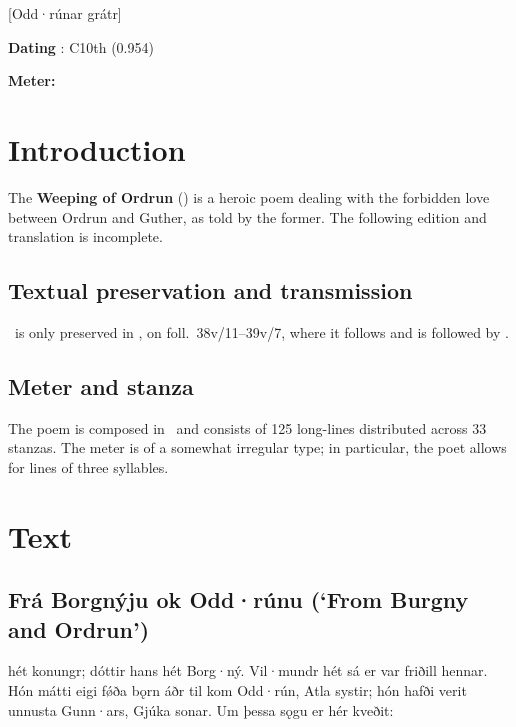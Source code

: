 [Odd·rúnar grátr]

\begin{flushright}%
\textbf{Dating} \parencite{Sapp2022}: C10th (0.954)

\textbf{Meter:} \Fornyrdislag%
\end{flushright}%

\section{Introduction}

The \textbf{Weeping of Ordrun} (\Oddrunargratr) is a heroic poem dealing with the forbidden love between Ordrun and Guther, as told by the former.  The following edition and translation is incomplete.

\subsection{Textual preservation and transmission}

\Oddrunargratr\ is only preserved in \Regius, on foll.~38v/11--39v/7, where it follows  and is followed by .

\subsection{Meter and stanza}

The poem is composed in \Fornyrdislag\ and consists of 125 long-lines distributed across 33 stanzas.  The meter is of a somewhat irregular type; in particular, the poet allows for lines of three syllables.

\newpage

\section{Text}

\subsection{Frá Borgnýju ok Odd·rúnu (‘From Burgny and Ordrun’)}

\bpg\bpa {} hét konungr; dóttir hans hét Borg·ný. Vil·mundr hét sá er var friðill hennar. Hón mátti eigi fǿða bǫrn áðr til kom Odd·rún, Atla systir; hón hafði verit unnusta Gunn·ars, Gjúka sonar. Um þessa sǫgu er hér kveðit:\epa

